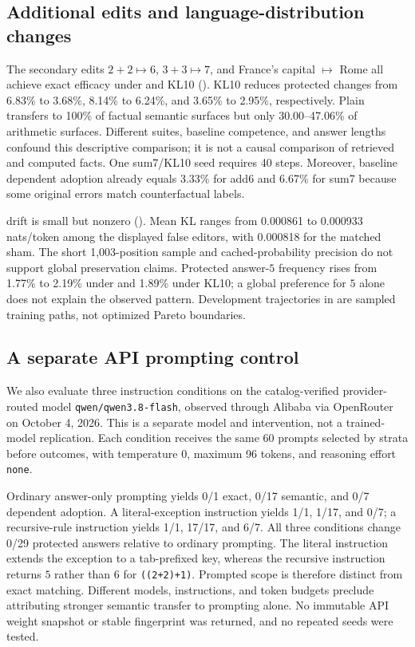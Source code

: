 \subsection{Additional edits and language-distribution changes}
The secondary edits $2+2\mapsto6$, $3+3\mapsto7$, and France's capital $\mapsto$ Rome all achieve exact efficacy under \ft and KL10 (). KL10 reduces protected changes from 6.83\% to 3.68\%, 8.14\% to 6.24\%, and 3.65\% to 2.95\%, respectively. Plain \ft transfers to 100\% of factual semantic surfaces but only 30.00--47.06\% of arithmetic surfaces. Different suites, baseline competence, and answer lengths confound this descriptive comparison; it is not a causal comparison of retrieved and computed facts. One sum7/KL10 seed requires 40 steps. Moreover, baseline dependent adoption already equals 3.33\% for add6 and 6.67\% for sum7 because some original errors match counterfactual labels.

\wikitext drift is small but nonzero (). Mean KL ranges from 0.000861 to 0.000933 nats/token among the displayed false editors, with 0.000818 for the matched sham. The short 1,003-position sample and cached-probability precision do not support global preservation claims. Protected answer-$5$ frequency rises from 1.77\% to 2.19\% under \ft and 1.89\% under KL10; a global preference for $5$ alone does not explain the observed pattern. Development trajectories in  are sampled training paths, not optimized Pareto boundaries.

\subsection{A separate API prompting control}
We also evaluate three instruction conditions on the catalog-verified provider-routed model \texttt{qwen/qwen3.8-flash}, observed through Alibaba via OpenRouter on October 4, 2026. This is a separate model and intervention, not a trained-model replication. Each condition receives the same 60 prompts selected by strata before outcomes, with temperature 0, maximum 96 tokens, and reasoning effort \texttt{none}.

Ordinary answer-only prompting yields 0/1 exact, 0/17 semantic, and 0/7 dependent adoption. A literal-exception instruction yields 1/1, 1/17, and 0/7; a recursive-rule instruction yields 1/1, 17/17, and 6/7. All three conditions change 0/29 protected answers relative to ordinary prompting. The literal instruction extends the exception to a tab-prefixed key, whereas the recursive instruction returns $5$ rather than $6$ for \texttt{((2+2)+1)}. Prompted scope is therefore distinct from exact matching. Different models, instructions, and token budgets preclude attributing stronger semantic transfer to prompting alone. No immutable API weight snapshot or stable fingerprint was returned, and no repeated seeds were tested.
